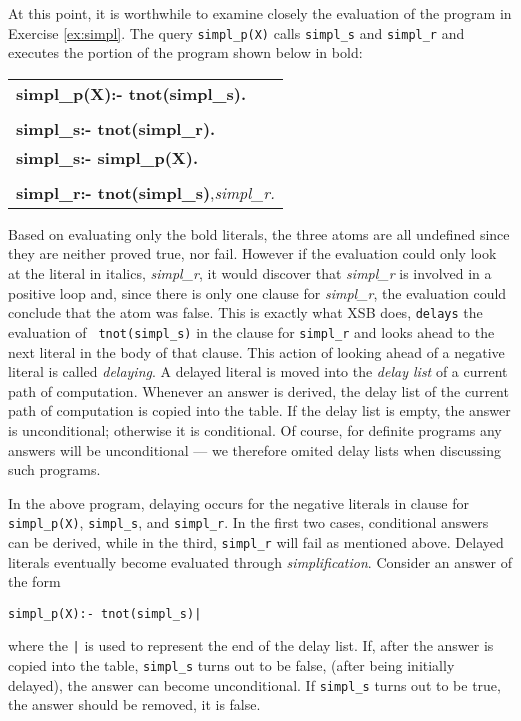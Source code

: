 At this point, it is worthwhile to examine closely the evaluation of
the program in Exercise \ref{ex:simpl}.  The query {\tt simpl\_p(X)}
calls {\tt simpl\_s} and {\tt simpl\_r} and executes the portion of
the program shown below in bold:
\begin{center}
\begin{tabular}{l}
{\bf simpl\_p(X):- tnot(simpl\_s).} \\
\\
{\bf simpl\_s:- tnot(simpl\_r).} \\
{\bf simpl\_s:- simpl\_p(X).} \\
\\
{\bf simpl\_r:- tnot(simpl\_s)},{\it simpl\_r.}
\end{tabular}
\end{center}
Based on evaluating only the bold literals, the three atoms are all
undefined since they are neither proved true, nor fail.  However if
the evaluation could only look at the literal in italics, {\em
simpl\_r}, it would discover that {\em simpl\_r} is involved in a
positive loop and, since there is only one clause for {\em simpl\_r},
the evaluation could conclude that the atom was false.  This is
exactly what XSB does, {\tt delays} the evaluation of {\tt
tnot(simpl\_s)} in the clause for {\tt simpl\_r} and looks ahead to
the next literal in the body of that clause.  This action of looking
ahead of a negative literal is called {\em delaying}.  A delayed
literal is moved into the {\em delay list} of a current path of
computation.  Whenever an answer is derived, the delay list of the
current path of computation is copied into the table.  If the delay
list is empty, the answer is unconditional; otherwise it is
conditional.  Of course, for definite programs any answers will be
unconditional --- we therefore omited delay lists when discussing such
programs.

In the above program, delaying occurs for the negative literals in
clause for {\tt simpl\_p(X)}, {\tt simpl\_s}, and {\tt simpl\_r}.
In the first two cases, conditional answers can be derived, while in
the third, {\tt simpl\_r} will fail as mentioned above.  Delayed
literals eventually become evaluated through {\em simplification}.
Consider an answer of the form 
\begin{verbatim}
simpl_p(X):- tnot(simpl_s)|
\end{verbatim}
where the {\tt |} is used to represent the end of the delay list.  If,
after the answer is copied into the table, {\tt simpl\_s} turns out to
be false, (after being initially delayed), the answer can become
unconditional.  If {\tt simpl\_s} turns out to be true, the answer
should be removed, it is false.

